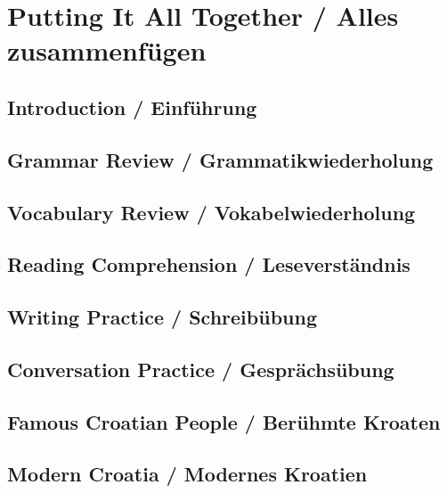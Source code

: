 \chapter{Putting It All Together / Alles zusammenfügen}

\section{Introduction / Einführung}

\section{Grammar Review / Grammatikwiederholung}

\section{Vocabulary Review / Vokabelwiederholung}

\section{Reading Comprehension / Leseverständnis}

\section{Writing Practice / Schreibübung}

\section{Conversation Practice / Gesprächsübung}

\section{Famous Croatian People / Berühmte Kroaten}

\section{Modern Croatia / Modernes Kroatien}

